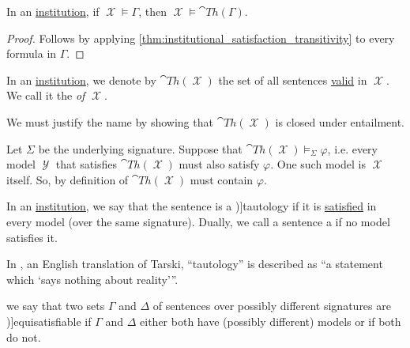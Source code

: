 \begin{corollary}\label{thm:institutional_satisfaction_closure}
  In an \hyperref[def:institution]{institution}, if \( \mscrX \vDash \Gamma \), then \( \mscrX \vDash \cat{Th}(\Gamma) \).
\end{corollary}
\begin{proof}
  Follows by applying \cref{thm:institutional_satisfaction_transitivity} to every formula in \( \Gamma \).
\end{proof}

\begin{definition}\label{def:theory_of_institutional_model}\mimprovised
  In an \hyperref[def:institution]{institution}, we denote by \( \cat{Th}(\mscrX) \) the set of all sentences \hyperref[def:propositional_semantics/satisfaction]{valid} in \( \mscrX \). We call it the  \emph{of} \( \mscrX \).
\end{definition}
\begin{defproof}
  We must justify the name by showing that \( \cat{Th}(\mscrX) \) is closed under entailment.

  Let \( \Sigma \) be the underlying signature. Suppose that \( \cat{Th}(\mscrX) \vDash_\Sigma \varphi \), i.e. every model \( \mscrY \) that satisfies \( \cat{Th}(\mscrX) \) must also satisfy \( \varphi \). One such model is \( \mscrX \) itself. So, by definition of \( \cat{Th}(\mscrX) \) must contain \( \varphi \).
\end{defproof}

\begin{definition}\label{def:tautology}\mimprovised
  In an \hyperref[def:institution]{institution}, we say that the sentence is a \term[en=tautology (\cite[12]{Kleene2002Logic})]{tautology} if it is \hyperref[def:propositional_semantics/satisfaction]{satisfied} in every model (over the same signature). Dually, we call a sentence a  if no model satisfies it.
\end{definition}
\begin{comments}
  \item In \cite[419]{Tarski1983Collection:LogicalConsequence}, an English translation of Tarski, \enquote{tautology} is described as \enquote{a statement which \enquote*{says nothing about reality}}.
\end{comments}

\begin{definition}\label{def:equisatisfiability}\mimprovised
  we say that two sets \( \Gamma \) and \( \Delta \) of sentences over possibly different signatures are \term[en=equisatisfiable (\cite[237]{Mimram2020ProgramEqualsProof})]{equisatisfiable} if \( \Gamma \) and \( \Delta \) either both have (possibly different) models or if both do not.
\end{definition}

